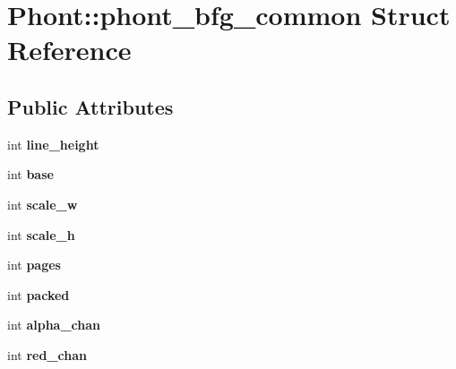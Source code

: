 \hypertarget{struct_phont_1_1phont__bfg__common}{\section{Phont\-:\-:phont\-\_\-bfg\-\_\-common Struct Reference}
\label{struct_phont_1_1phont__bfg__common}
}
\subsection*{Public Attributes}
\begin{DoxyCompactItemize}
\item 
\hypertarget{struct_phont_1_1phont__bfg__common_acb8e2d645c592c839e72e064ac26efc6}{int {\bfseries line\-\_\-height}}\label{struct_phont_1_1phont__bfg__common_acb8e2d645c592c839e72e064ac26efc6}

\item 
\hypertarget{struct_phont_1_1phont__bfg__common_a622662088897864f4dbe6a0eed9f4ef8}{int {\bfseries base}}\label{struct_phont_1_1phont__bfg__common_a622662088897864f4dbe6a0eed9f4ef8}

\item 
\hypertarget{struct_phont_1_1phont__bfg__common_a672472d8cff9cee6a897197126d1b0fe}{int {\bfseries scale\-\_\-w}}\label{struct_phont_1_1phont__bfg__common_a672472d8cff9cee6a897197126d1b0fe}

\item 
\hypertarget{struct_phont_1_1phont__bfg__common_ae0a11017d6669c2eca6cd39b235e6d8e}{int {\bfseries scale\-\_\-h}}\label{struct_phont_1_1phont__bfg__common_ae0a11017d6669c2eca6cd39b235e6d8e}

\item 
\hypertarget{struct_phont_1_1phont__bfg__common_a93641813dd9fb795ada51c9155a1a742}{int {\bfseries pages}}\label{struct_phont_1_1phont__bfg__common_a93641813dd9fb795ada51c9155a1a742}

\item 
\hypertarget{struct_phont_1_1phont__bfg__common_a9aeaf888c836be9034c49d7cf3f6a0aa}{int {\bfseries packed}}\label{struct_phont_1_1phont__bfg__common_a9aeaf888c836be9034c49d7cf3f6a0aa}

\item 
\hypertarget{struct_phont_1_1phont__bfg__common_a5ca48d90730abad47cd2beab383c8ceb}{int {\bfseries alpha\-\_\-chan}}\label{struct_phont_1_1phont__bfg__common_a5ca48d90730abad47cd2beab383c8ceb}

\item 
\hypertarget{struct_phont_1_1phont__bfg__common_a3c0672ce575755070a21c9cf7e3f24eb}{int {\bfseries red\-\_\-chan}}\label{struct_phont_1_1phont__bfg__common_a3c0672ce575755070a21c9cf7e3f24eb}


\end{DoxyCompactItemize}
